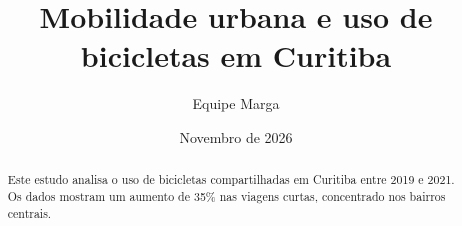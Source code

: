 \documentclass[11pt]{article}
\title{Mobilidade urbana e uso de bicicletas em Curitiba}
\author{Equipe Marga}
\date{Novembro de 2026}
\begin{document}
\maketitle

\begin{abstract}
Este estudo analisa o uso de bicicletas compartilhadas em Curitiba entre 2019 e 2021.
Os dados mostram um aumento de 35\% nas viagens curtas, concentrado nos bairros centrais.
\end{abstract}






\end{document}
